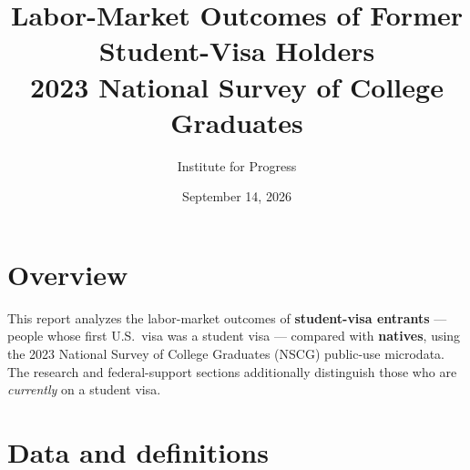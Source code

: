 \documentclass[11pt]{article}
\title{\textbf{Labor-Market Outcomes of Former Student-Visa Holders}\\[2pt]\large 2023 National Survey of College Graduates}
\author{Institute for Progress}
\date{September 14, 2026}
\begin{document}
\maketitle
\thispagestyle{empty}
\section*{Overview}
This report analyzes the labor-market outcomes of \textbf{student-visa entrants} --- people whose first U.S.\ visa was a student visa --- compared with \textbf{natives}, using the 2023 National Survey of College Graduates (NSCG) public-use microdata. The research and federal-support sections additionally distinguish those who are \emph{currently} on a student visa.\par
\section*{Data and definitions}
\end{document}
